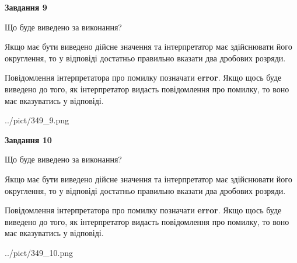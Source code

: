 \documentclass[12pt, ukrainian]{article}
\begin{document}
{\begin {Large}
{\begin {center}\textbf{Завдання 9}\end {center}}\par
Що буде виведено за виконання? \par

Якщо має бути виведено дійсне значення та інтерпретатор має здійснювати його округлення, 
то у відповіді достатньо правильно вказати два дробових розряди.

Повідомлення інтерпретатора про помилку позначати \textbf{error}.
Якщо щось буде виведено до того, як інтерпретатор видасть повідомлення про помилку, 
то воно має вказуватись у відповіді. \par

\begin{center}
	{../pict/349_9.png}
\end{center}
\newpage

{\begin {center}\textbf{Завдання 10}\end {center}}\par
Що буде виведено за виконання? \par

Якщо має бути виведено дійсне значення та інтерпретатор має здійснювати його округлення, 
то у відповіді достатньо правильно вказати два дробових розряди.

Повідомлення інтерпретатора про помилку позначати \textbf{error}.
Якщо щось буде виведено до того, як інтерпретатор видасть повідомлення про помилку, 
то воно має вказуватись у відповіді. \par

\begin{center}
	{../pict/349_10.png}
\end{center}
\newpage

\end {Large}}
\end{document}
